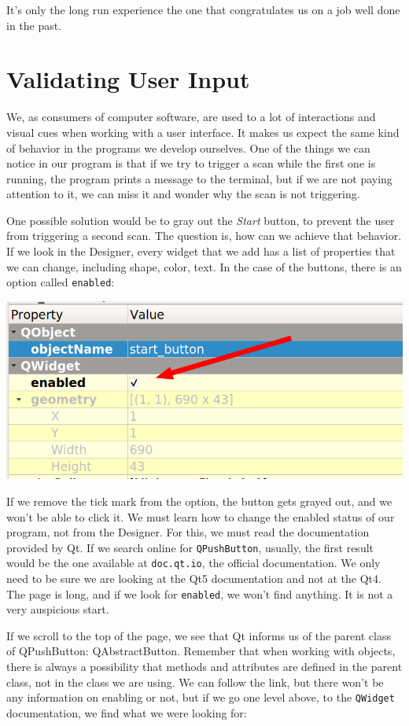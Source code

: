 It's only the long run experience the one that congratulates us on a job well done in the past.

\section{Validating User Input}\label{sec:validating-user-input}
We, as consumers of computer software, are used to a lot of interactions and visual cues when working with a user interface. It makes us expect the same kind of behavior in the programs we develop ourselves. One of the things we can notice in our program is that if we try to trigger a scan while the first one is running, the program prints a message to the terminal, but if we are not paying attention to it, we can miss it and wonder why the scan is not triggering.

One possible solution would be to gray out the \emph{Start} button, to prevent the user from triggering a second scan. The question is, how can we achieve that behavior. If we look in the Designer, every widget that we add has a list of properties that we can change, including shape, color, text. In the case of the buttons, there is an option called \texttt{enabled}:

\begin{center}
    \includegraphics[width=.4\linewidth]{images/Chapter_09/10_enabled_button.png}
\end{center}

If we remove the tick mark from the option, the button gets grayed out, and we won't be able to click it. We must learn how to change the enabled status of our program, not from the Designer. For this, we must read the documentation provided by Qt. If we search online for \texttt{QPushButton}, usually, the first result would be the one available at \texttt{doc.qt.io}, the official documentation. We only need to be sure we are looking at the Qt5 documentation and not at the Qt4. The page is long, and if we look for \texttt{enabled}, we won't find anything. It is not a very auspicious start.

If we scroll to the top of the page, we see that Qt informs us of the parent class of QPushButton: QAbstractButton. Remember that when working with objects, there is always a possibility that methods and attributes are defined in the parent class, not in the class we are using. We can follow the link, but there won't be any information on enabling or not, but if we go one level above, to the \texttt{QWidget} documentation, we find what we were looking for:

